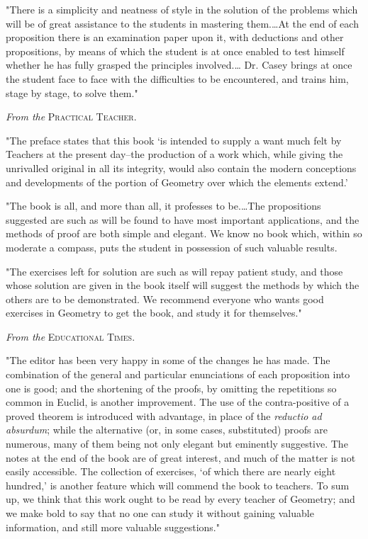 \documentclass[oneside]{book}
\begin{document}
\begin{footnotesize}
"There is a simplicity and neatness of style in the solution of
the problems which will be of great assistance to the students in
mastering them.\ldots At the end of each proposition there is an
examination paper upon it, with deductions and other propositions,
by means of which the student is at once enabled to test
himself whether he has fully grasped the principles involved.\ldots
Dr. Casey brings at once the student face to face with the difficulties
to be encountered, and trains him, stage by stage, to solve
them."

\medskip
\begin{center}
\textit{From the} \textsc{Practical Teacher}.
\end{center}
\nopagebreak

"The preface states that this book `is intended to supply a
want much felt by Teachers at the present day--the production
of a work which, while giving the unrivalled original in all its
integrity, would also contain the modern conceptions and developments
of the portion of Geometry over which the elements
extend.'

"The book is all, and more than all, it professes to be.\ldots The
propositions suggested are such as will be found to have most
important applications, and the methods of proof are both simple
and elegant. We know no book which, within so moderate
a compass, puts the student in possession of such valuable results.

"The exercises left for solution are such as will repay patient
study, and those whose solution are given in the book itself will
suggest the methods by which the others are to be demonstrated.
We recommend everyone who wants good exercises in Geometry
to get the book, and study it for themselves."

\medskip
\begin{center}
\textit{From the} \textsc{Educational Times}.
\end{center}
\nopagebreak

"The editor has been very happy in some of the changes he
has made. The combination of the general and particular enunciations
of each proposition into one is good; and the shortening
of the proofs, by omitting the repetitions so common in Euclid, is
another improvement. The use of the contra-positive of a proved
theorem is introduced with advantage, in place of the \textit{reductio ad
absurdum}; while the alternative (or, in some cases, substituted)
proofs are numerous, many of them being not only elegant but
eminently suggestive. The notes at the end of the book are of
great interest, and much of the matter is not easily accessible.
The collection of exercises, `of which there are nearly eight
hundred,' is another feature which will commend the book to
teachers. To sum up, we think that this work ought to be read
by every teacher of Geometry; and we make bold to say that no
one can study it without gaining valuable information, and still
more valuable suggestions."


\end{footnotesize}
\end{document}
